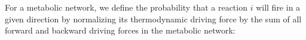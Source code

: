 For a metabolic network, we define the probability that a reaction $i$ will fire in a given direction by normalizing its thermodynamic driving force by the sum of all forward and backward driving forces in the metabolic network: